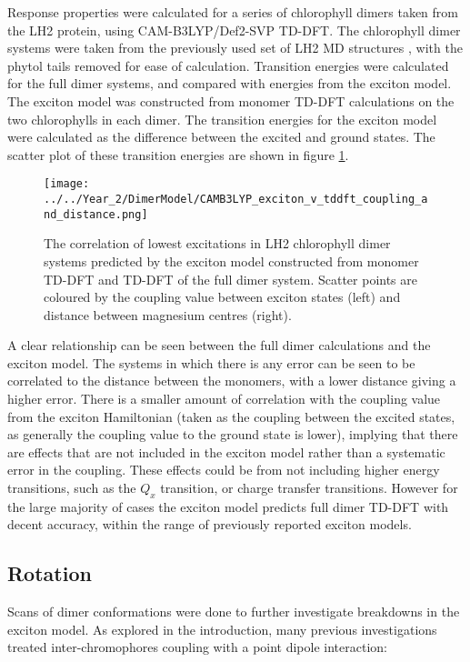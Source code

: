 Response properties were calculated for a series of chlorophyll dimers taken from
the LH2 protein, using CAM-B3LYP/Def2-SVP TD-DFT. The chlorophyll dimer systems
were taken from the previously used set of LH2 MD structures \cite{Stross2016},
with the phytol tails removed for ease of calculation. Transition energies were
calculated for the full dimer systems, and compared with energies from the exciton 
model. The exciton model was constructed from monomer TD-DFT calculations on the
two chlorophylls in each dimer. The transition energies for the exciton model were
calculated as the difference between the excited and ground states. The scatter
plot of these transition energies are shown in figure \ref{fig:camb3lyp_excitons}. 

\begin{figure}
    \centering
    \texttt{[image: ../../Year\_2/DimerModel/CAMB3LYP\_exciton\_v\_tddft\_coupling\_and\_distance.png]}
    \label{fig:camb3lyp_excitons}
    \caption{The correlation of lowest excitations in LH2 chlorophyll dimer systems
    predicted by the exciton model constructed from monomer TD-DFT and TD-DFT of
    the full dimer system. Scatter points are coloured by the coupling value between
    exciton states (left) and distance between magnesium centres (right).}
\end{figure}

A clear relationship can be seen between the full dimer calculations and the exciton
model. The systems in which there is any error can be seen to be correlated to the
distance between the monomers, with a lower distance giving a higher error. There 
is a smaller amount of correlation with the coupling value from the exciton Hamiltonian
(taken as the coupling between the excited states, as generally the coupling value
to the ground state is lower), implying that there are effects that are not included
in the exciton model rather than a systematic error in the coupling. These effects
could be from not including higher energy transitions, such as the $Q_x$ transition,
or charge transfer transitions. However for the large majority of cases the exciton
model predicts full dimer TD-DFT with decent accuracy, within the range of previously
reported exciton models.

\subsection{Rotation}
\label{subsec:rotation}

Scans of dimer conformations were done to further investigate breakdowns in the
exciton model. As explored in the introduction, many previous investigations treated
inter-chromophores coupling with a point dipole interaction:

